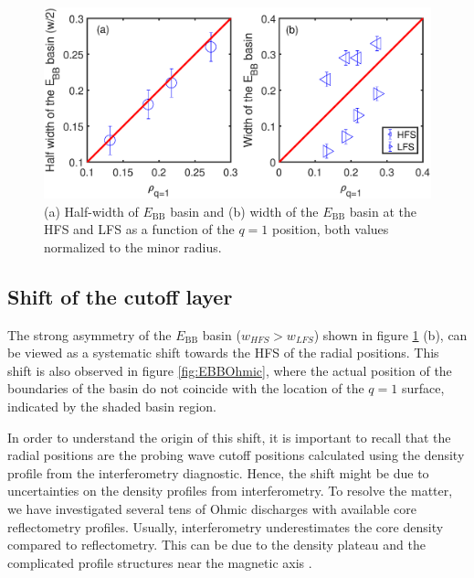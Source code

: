 \begin{figure}[!h]
\begin{centering}
\includegraphics[scale=0.5]{fig_BasinWidth_v2.eps}
\par\end{centering}
\caption{(a) Half-width of $E_\mathrm{BB}$ basin and (b) width of the $E_\mathrm{BB}$ basin at the HFS and LFS as a function of the $q = 1$ position, both values normalized to the minor radius.}
\label{fig:BasinWidth}
\end{figure}


\subsection{Shift of the cutoff layer} \label{sec:shift_of_cutoff}

The strong asymmetry of the $E_\mathrm{BB}$ basin ($w_{HFS} > w_{LFS}$) shown in figure \ref{fig:BasinWidth} (b), can be viewed as a systematic shift towards the HFS of the radial positions. This shift is also observed in figure \ref{fig:EBBOhmic}, where the actual position of the boundaries of the basin do not coincide with the location of the $q = 1$ surface, indicated by the shaded basin region.

In order to understand the origin of this shift, it is important to recall that the radial positions are the probing wave cutoff positions calculated using the density profile from the interferometry diagnostic. Hence, the shift might be due to uncertainties on the density profiles from interferometry. To resolve the matter, we have investigated several tens of Ohmic discharges with available core reflectometry profiles. Usually, interferometry underestimates the core density compared to reflectometry. This can be due to the density plateau and the complicated profile structures near the magnetic axis \cite{Sabot_2006_PPCF}.

